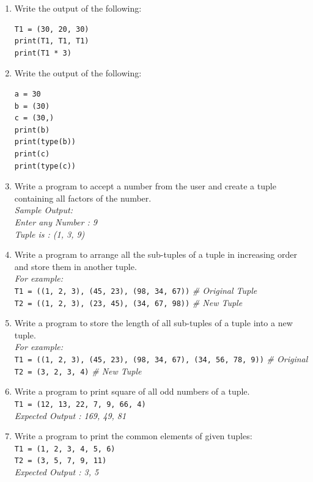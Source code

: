 \documentclass[11pt,a4paper]{article}
\begin{document}
\begin{enumerate}[label=\textbf{Q\arabic*.}]
\item Write the output of the following:
\begin{lstlisting}
T1 = (30, 20, 30)
print(T1, T1, T1)
print(T1 * 3)
\end{lstlisting}

\item Write the output of the following:
\begin{lstlisting}
a = 30
b = (30)
c = (30,)
print(b)
print(type(b))
print(c)
print(type(c))
\end{lstlisting}

\item Write a program to accept a number from the user and create a tuple containing all factors of the number.\\
\textit{Sample Output:}\\
\textit{Enter any Number : 9}\\
\textit{Tuple is : (1, 3, 9)}

\item Write a program to arrange all the sub-tuples of a tuple in increasing order and store them in another tuple.\\
\textit{For example:}\\
\texttt{T1 = ((1, 2, 3), (45, 23), (98, 34, 67))} \textit{\# Original Tuple}\\
\texttt{T2 = ((1, 2, 3), (23, 45), (34, 67, 98))} \textit{\# New Tuple}

\item Write a program to store the length of all sub-tuples of a tuple into a new tuple.\\
\textit{For example:}\\
\texttt{T1 = ((1, 2, 3), (45, 23), (98, 34, 67), (34, 56, 78, 9))} \textit{\# Original}\\
\texttt{T2 = (3, 2, 3, 4)} \textit{\# New Tuple}

\item Write a program to print square of all odd numbers of a tuple.\\
\texttt{T1 = (12, 13, 22, 7, 9, 66, 4)}\\
\textit{Expected Output : 169, 49, 81}

\item Write a program to print the common elements of given tuples:\\
\texttt{T1 = (1, 2, 3, 4, 5, 6)}\\
\texttt{T2 = (3, 5, 7, 9, 11)}\\
\textit{Expected Output : 3, 5}


\end{enumerate}
\end{document}
